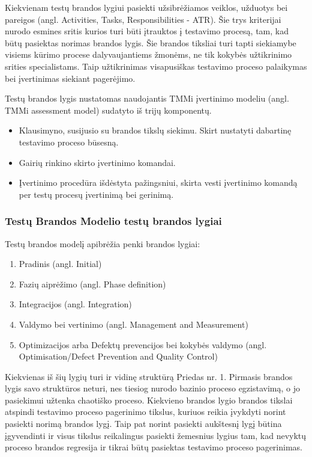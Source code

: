 \documentclass{VUMIFPSkursinis}
\begin{document}
Kiekvienam testų brandos lygiui pasiekti užsibrėžiamos veiklos, užduotys bei pareigos (angl. Activities, Tasks, Responsibilities - ATR). Šie trys kriterijai nurodo esmines sritis kurios turi būti įtrauktos į testavimo procesą, tam, kad būtų pasiektas norimas brandos lygis. Šie brandos tiksliai turi tapti siekiamybe visiems kūrimo procese dalyvaujantiems žmonėms, ne tik kokybės užtikrinimo srities specialistams. Taip užtikrinimas visapusiškas testavimo proceso palaikymas bei įvertinimas siekiant pagerėjimo.

Testų brandos lygis nustatomas naudojantis TMMi įvertinimo modeliu (angl. TMMi assessment model) sudatyto iš trijų komponentų.
\begin{itemize}
   \item Klausimyno, susijusio su brandos tikslų siekimu. Skirt nustatyti dabartinę testavimo proceso būsesną.
   \item Gairių rinkino skirto įvertinimo komandai.
   \item Įvertinimo procedūra išdėstyta pažingsniui, skirta vesti įvertinimo komandą per testų procesų įvertinimą bei gerinimą.
\end{itemize}

\subsubsection{Testų Brandos Modelio testų brandos lygiai}
Testų brandos modelį apibrėžia penki brandos lygiai\cite{Burnstein:2010:PST:1965566}:
\begin{enumerate}
   \item Pradinis (angl. Initial)
   \item Fazių aiprėžimo (angl. Phase definition)
   \item Integracijos (angl. Integration)
   \item Valdymo bei vertinimo (angl. Management and Measurement)
   \item Optimizacijos arba Defektų prevencijos bei kokybės valdymo (angl. Optimisation/Defect Prevention and Quality Control)
\end{enumerate}
Kiekvienas iš šių lygių turi ir vidinę struktūrą Priedas nr. 1. Pirmasis brandos lygis savo struktūros neturi, nes tiesiog nurodo bazinio proceso egzistavimą, o jo pasiekimui užtenka chaotiško proceso. Kiekvieno brandos lygio brandos tikslai atspindi testavimo proceso pagerinimo tikslus, kuriuos reikia įvykdyti norint pasiekti norimą brandos lygį. Taip pat norint pasiekti aukštesnį lygį būtina įgyvendinti ir visus tikslus reikalingus pasiekti žemesnius lygius tam, kad nevyktų proceso brandos regresija ir tikrai būtų pasiektas testavimo proceso pagerinimas.\cite{Tmmi}
\end{document}
